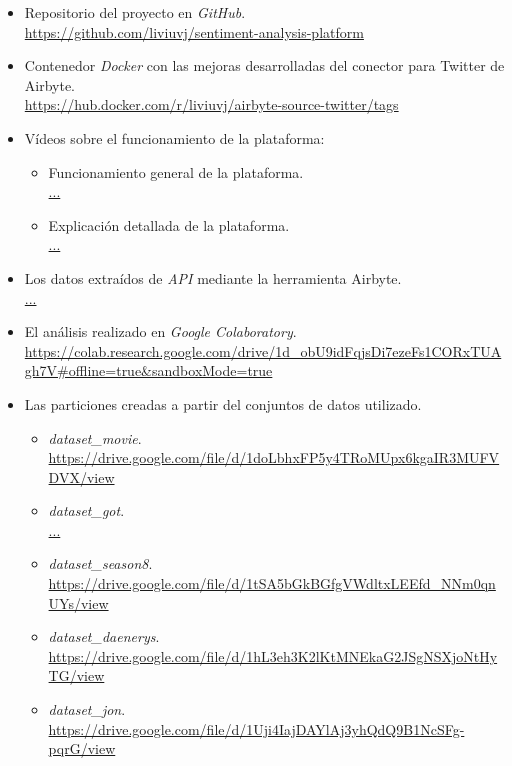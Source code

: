 \begin{itemize}
    \item Repositorio del proyecto en \textit{GitHub}.\\
        \url{https://github.com/liviuvj/sentiment-analysis-platform}
    
    \item Contenedor \textit{Docker} con las mejoras desarrolladas del conector para Twitter de  Airbyte.\\
        \url{https://hub.docker.com/r/liviuvj/airbyte-source-twitter/tags}

    \item Vídeos sobre el funcionamiento de la plataforma:
    \begin{itemize}
        \item Funcionamiento general de la plataforma.\\
            \url{...}
        \item Explicación detallada de la plataforma.\\
            \url{...}
    \end{itemize}

    \item Los datos extraídos de \textit{API} mediante la herramienta Airbyte.\\
        \url{...}

    \item El análisis realizado en \textit{Google Colaboratory}.\\
        \url{https://colab.research.google.com/drive/1d_obU9idFqjsDi7ezeFs1CORxTUAgh7V#offline=true&sandboxMode=true}

    \item Las particiones creadas a partir del conjuntos de datos utilizado.
    \begin{itemize}
        \item \textit{dataset\_movie}.\\
            \url{https://drive.google.com/file/d/1doLbhxFP5y4TRoMUpx6kgaIR3MUFVDVX/view}
        \item \textit{dataset\_got}.\\
            \url{...}
        \item \textit{dataset\_season8}.\\
            \url{https://drive.google.com/file/d/1tSA5bGkBGfgVWdltxLEEfd_NNm0qnUYs/view}
        \item \textit{dataset\_daenerys}.\\
            \url{https://drive.google.com/file/d/1hL3eh3K2lKtMNEkaG2JSgNSXjoNtHyTG/view}
        \item \textit{dataset\_jon}.\\
            \url{https://drive.google.com/file/d/1Uji4IajDAYlAj3yhQdQ9B1NcSFg-pqrG/view}
    \end{itemize}
    
\end{itemize}


